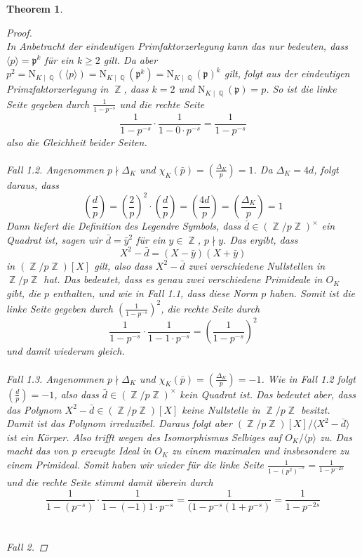 \documentclass[10pt,a4paper]{article}
\theoremstyle{plain}
\newtheorem{thm}{Theorem}[section]
\theoremstyle{definition}
\theoremstyle{remark}
\DeclareMathOperator{\Q}{\mathbb{Q}}
\DeclareMathOperator{\Z}{\mathbb{Z}}
\begin{document}
\begin{thm}
\begin{proof}
\\
In Anbetracht der eindeutigen Primfaktorzerlegung kann das nur bedeuten, dass $\langle p\rangle =\mathfrak{p}^k$ für ein $k\geq 2$ gilt. Da aber $p^2=\mathrm{N}_{K\mid \Q}(\langle p\rangle)=\mathrm{N}_{K\mid \Q}(\mathfrak{p}^k) =\mathrm{N}_{K\mid \Q}(\mathfrak{p})^k $ gilt, folgt aus der eindeutigen Primzfaktorzerlegung in $\Z$, dass $k = 2$ und $\mathrm{N}_{K\mid\Q}(\mathfrak{p}) =p$. So ist die linke Seite gegeben durch $\frac{1}{1-p^{-s}}$ und die rechte Seite $$\frac{1}{1-p^{-s}}\cdot \frac{1}{1-0\cdot p^{-s}}=\frac{1}{1-p^{-s}}$$also die Gleichheit beider Seiten.
\\
\\
\textit{Fall 1.2.}
Angenommen $p \nmid \Delta_K$ und $\chi_K(\bar{p})=(\frac{\Delta_K}{p})= 1$. Da $\Delta_K = 4d$, folgt daraus, dass $$(\frac{d}{p})=(\frac{2}{p})^2\cdot (\frac{d}{p})=(\frac{4d}{p})=(\frac{\Delta_K}{p})=1$$Dann liefert die Definition des Legendre Symbols, dass $\bar{d} \in (\Z/p\Z)^\times$ ein Quadrat ist, sagen wir $\bar{d}=\bar{y}^2$ für ein $y \in \Z$,  $p \nmid y$. Das ergibt, dass $$X^2-\bar{d}=(X-\bar{y})(X+\bar{y})$$ in $(\Z/p\Z)[X] $ gilt, also dass $X^2-\bar{d}$ zwei verschiedene Nullstellen in $\Z/p\Z$ hat. Das bedeutet, dass es genau zwei verschiedene Primideale in $O_K$ gibt, die $p$ enthalten, und wie in Fall 1.1, dass diese Norm $p$ haben. Somit ist die linke Seite gegeben durch $(\frac{1}{1-p^{-s}})^2$, die rechte Seite durch $$\frac{1}{1-p^{-s}}\cdot\frac{1}{1-1\cdot p^{-s}}=(\frac{1}{1-p^{-s}})^2$$ und damit wiederum gleich.
\\
\\
\textit{Fall 1.3.}
Angenommen $p \nmid \Delta_K$ und $\chi_K(\bar{p})=(\frac{\Delta_K}{p})= -1$. Wie in Fall 1.2 folgt $(\frac{d}{p})=-1$, also dass $\bar{d} \in (\Z/p\Z)^\times$ kein Quadrat ist. Das bedeutet aber, dass das Polynom $X^2-\bar{d} \in (\Z/p\Z)[X] $ keine Nullstelle in $\Z/p\Z$ besitzt. Damit ist das Polynom irreduzibel. Daraus folgt aber $(\Z/p\Z)[X]/\langle X^{2}-\bar{d}\rangle$ ist ein Körper. Also trifft wegen des Isomorphismus Selbiges auf $O_K/\langle p\rangle$ zu. Das macht das von $p$ erzeugte Ideal in $O_K$ zu einem maximalen und insbesondere zu einem Primideal. Somit haben wir wieder für die linke Seite $\frac{1}{1-(p^{2})^{-s}}=\frac{1}{1-p^{-2s}}$ und die rechte Seite stimmt damit überein durch $$\frac{1}{1-(p^{-s})}\cdot\frac{1}{1-(-1)1 \cdot p^{-s}}=\frac{1}{(1-p^{-s}(1+p^{-s})}=\frac{1}{1-p^{-2s}}$$
\\
\\
\textit{Fall 2.}

\end{proof}
\end{thm}
\end{document}
